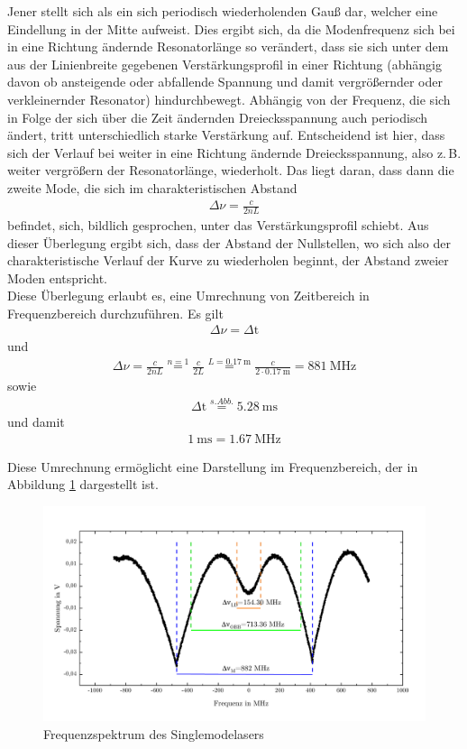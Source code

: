 \documentclass[a4paper,twoside,final]{article}
\begin{document}
Jener stellt sich als ein sich periodisch wiederholenden Gauß dar, welcher eine Eindellung in der Mitte aufweist. Dies ergibt sich, da die Modenfrequenz sich bei in eine Richtung ändernde Resonatorlänge so verändert, dass sie sich unter dem aus der Linienbreite gegebenen Verstärkungsprofil \glqq in einer Richtung (abhängig davon ob ansteigende oder abfallende Spannung und damit vergrößernder oder verkleinernder Resonator) hindurchbewegt\grqq. Abhängig von der Frequenz, die sich in Folge der sich über die Zeit ändernden Dreiecksspannung auch periodisch ändert, tritt unterschiedlich starke Verstärkung auf. Entscheidend ist hier, dass sich der Verlauf bei weiter in eine Richtung ändernde Dreiecksspannung, also z.\,B. weiter vergrößern der Resonatorlänge, wiederholt. Das liegt daran, dass dann die zweite Mode, die sich im charakteristischen Abstand
\begin{align}
  \Delta \nu = \frac{c}{2nL}
\end{align}
befindet, sich, bildlich gesprochen, unter das Verstärkungsprofil schiebt. Aus dieser Überlegung ergibt sich, dass der Abstand der Nullstellen, wo sich also der charakteristische Verlauf der Kurve zu wiederholen beginnt, der Abstand zweier Moden entspricht.\\
Diese Überlegung erlaubt es, eine Umrechnung von Zeitbereich in Frequenzbereich durchzuführen. Es gilt
\begin{align}
  \Delta \nu = \Delta \text{t}
\end{align}
und
\begin{align}
  \Delta \nu = \frac{c}{2nL} \overset{n=1}{=} \frac{c}{2L} \overset{L=\SI{0,17}{\meter}}{=} \frac{c}{2\cdot \SI{0,17}{\meter}}=\SI{881}{\mega\hertz}
\end{align}
sowie
\begin{align}
  \Delta \text{t} \overset{s. Abb.}=\SI{5,28}{\milli\second}
\end{align}
und damit
\begin{align}
  \SI{1}{\milli\second}=\SI{1,67}{\mega\hertz}
\end{align}

Diese Umrechnung ermöglicht eine Darstellung im Frequenzbereich, der in Abbildung \ref{fig:Frequenzverlauf} dargestellt ist.

\begin{figure}[htp]
    \centering
        \includegraphics[width=1\textwidth]{Bilder/Profil_SML_Frequenzbild.pdf}
    \caption{Frequenzspektrum des Singlemodelasers}
    \label{fig:Frequenzverlauf}
\end{figure}
\end{document}
